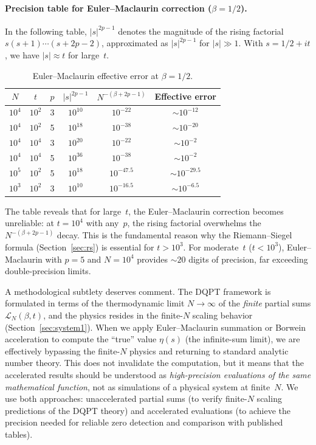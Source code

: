 \paragraph{Precision table for Euler--Maclaurin correction ($\beta = 1/2$).}
In the following table, $|s|^{2p-1}$ denotes the magnitude of the rising factorial
$s(s{+}1)\cdots(s{+}2p{-}2)$, approximated as $|s|^{2p-1}$ for $|s| \gg 1$. With
$s = 1/2 + it$, we have $|s| \approx t$ for large~$t$.

\begin{table}[H]
\centering
\caption{Euler--Maclaurin effective error at $\beta = 1/2$.}
\label{tab:em-precision}
\begin{tabular}{@{}cccccc@{}}
\toprule
$N$ & $t$ & $p$ & $|s|^{2p-1}$ & $N^{-(\beta+2p-1)}$ & Effective error \\
\midrule
$10^4$ & $10^2$ & 3 & $10^{10}$  & $10^{-22}$ & $\sim 10^{-12}$ \\
$10^4$ & $10^2$ & 5 & $10^{18}$  & $10^{-38}$ & $\sim 10^{-20}$ \\
$10^4$ & $10^4$ & 3 & $10^{20}$  & $10^{-22}$ & $\sim 10^{-2}$  \\
$10^4$ & $10^4$ & 5 & $10^{36}$  & $10^{-38}$ & $\sim 10^{-2}$  \\
$10^5$ & $10^2$ & 5 & $10^{18}$  & $10^{-47.5}$ & $\sim 10^{-29.5}$ \\
$10^3$ & $10^2$ & 3 & $10^{10}$  & $10^{-16.5}$ & $\sim 10^{-6.5}$ \\
\bottomrule
\end{tabular}
\end{table}

The table reveals that for large~$t$, the Euler--Maclaurin correction becomes unreliable:
at $t = 10^4$ with any~$p$, the rising factorial overwhelms the $N^{-(\beta+2p-1)}$ decay.
This is the fundamental reason why the Riemann--Siegel formula (Section~\ref{sec:rs}) is
essential for $t > 10^3$. For moderate~$t$ ($t < 10^3$), Euler--Maclaurin with $p = 5$
and $N = 10^4$ provides $\sim 20$ digits of precision, far exceeding double-precision
limits.

\begin{remark}
\label{rem:acceleration-circularity}
A methodological subtlety deserves comment. The DQPT framework is formulated in terms of
the thermodynamic limit $N \to \infty$ of the \emph{finite} partial sums
$\mathcal{L}_N(\beta,t)$, and the physics resides in the finite-$N$ scaling behavior
(Section~\ref{sec:system1}). When we apply Euler--Maclaurin summation or Borwein
acceleration to compute the ``true'' value $\eta(s)$ (the infinite-sum limit), we are
effectively bypassing the finite-$N$ physics and returning to standard analytic number
theory. This does not invalidate the computation, but it means that the accelerated
results should be understood as \emph{high-precision evaluations of the same mathematical
function}, not as simulations of a physical system at finite~$N$. We use both approaches:
unaccelerated partial sums (to verify finite-$N$ scaling predictions of the DQPT theory)
and accelerated evaluations (to achieve the precision needed for reliable zero detection
and comparison with published tables).
\end{remark}

